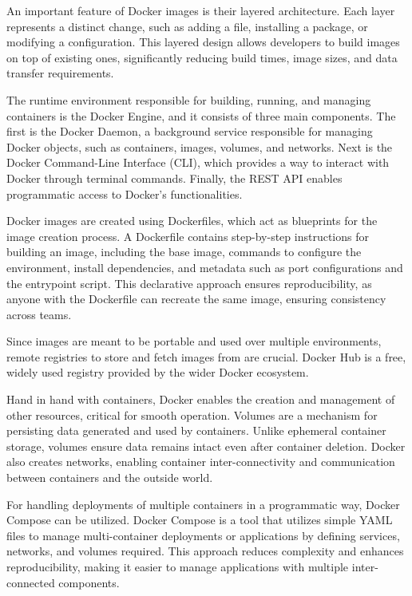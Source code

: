 An important feature of Docker images is their layered architecture. Each layer represents a distinct change, such as adding a file, installing a package, or modifying a configuration. This layered design allows developers to build images on top of existing ones, significantly reducing build times, image sizes, and data transfer requirements.

The runtime environment responsible for building, running, and managing containers is the Docker Engine, and it consists of three main components. The first is the Docker Daemon, a background service responsible for managing Docker objects, such as containers, images, volumes, and networks. Next is the Docker Command-Line Interface (CLI), which provides a way to interact with Docker through terminal commands. Finally, the REST API enables programmatic access to Docker's functionalities.

Docker images are created using Dockerfiles, which act as blueprints for the image creation process. A Dockerfile contains step-by-step instructions for building an image, including the base image, commands to configure the environment, install dependencies, and metadata such as port configurations and the entrypoint script. This declarative approach ensures reproducibility, as anyone with the Dockerfile can recreate the same image, ensuring consistency across teams.

Since images are meant to be portable and used over multiple environments, remote registries to store and fetch images from are crucial. Docker Hub is a free, widely used registry provided by the wider Docker ecosystem.

Hand in hand with containers, Docker enables the creation and management of other resources, critical for smooth operation. Volumes are a mechanism for persisting data generated and used by containers. Unlike ephemeral container storage, volumes ensure data remains intact even after container deletion. Docker also creates networks, enabling container inter-connectivity and communication between containers and the outside world.

For handling deployments of multiple containers in a programmatic way, Docker Compose can be utilized. Docker Compose is a tool that utilizes simple YAML files to manage multi-container deployments or applications by defining services, networks, and volumes required. This approach reduces complexity and enhances reproducibility, making it easier to manage applications with multiple inter-connected components.

